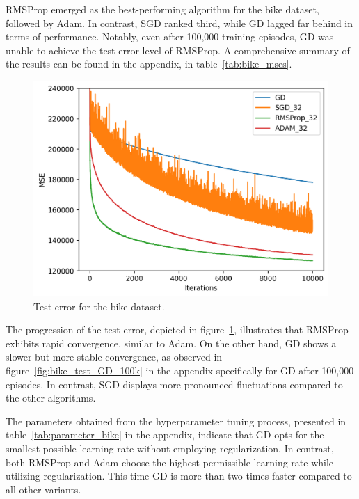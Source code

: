 \documentclass[10pt,conference,compsocconf]{IEEEtran}
\begin{document}
RMSProp emerged as the best-performing algorithm for the bike dataset, followed by Adam. In contrast, SGD ranked third, while GD lagged far behind in terms of performance. Notably, even after 100,000 training episodes, GD was unable to achieve the test error level of RMSProp.
A comprehensive summary of the results can be found in the appendix, in table~\ref{tab:bike_mses}.


\begin{figure}[tbp]
	\centering
	\includegraphics[width=\columnwidth]{pictures/bike_test_32}
	\caption{Test error for the bike dataset.}
	\vspace{-3mm}
	\label{fig:bike_test_32}
\end{figure}

The progression of the test error, depicted in figure~\ref{fig:bike_test_32}, illustrates that RMSProp exhibits rapid convergence, similar to Adam. 
On the other hand, GD shows a slower but more stable convergence, as observed in figure~\ref{fig:bike_test_GD_100k} in the appendix specifically for GD after 100,000 episodes. 
In contrast, SGD displays more pronounced fluctuations compared to the other algorithms.

The parameters obtained from the hyperparameter tuning process, presented in table~\ref{tab:parameter_bike} in the appendix, indicate that GD opts for the smallest possible learning rate without employing regularization. 
In contrast, both RMSProp and Adam choose the highest permissible learning rate while utilizing regularization.
This time GD is more than two times faster compared to all other variants.
\end{document}
